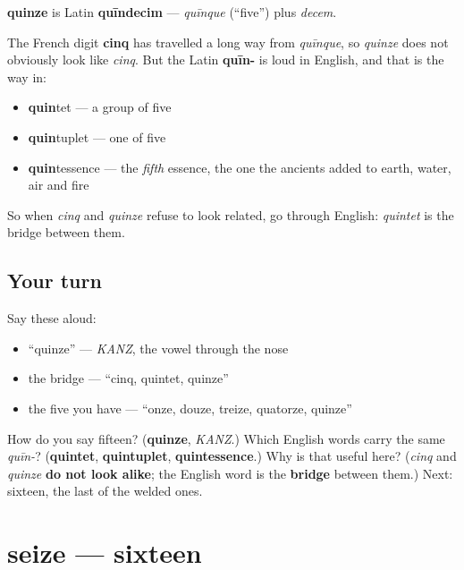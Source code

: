 \begin{cousinweb}
\textbf{quinze} is Latin \textbf{quīndecim} — \emph{quīnque} (\textquotedblleft{}five\textquotedblright{}) plus \emph{decem}.

The French digit \textbf{cinq} has travelled a long way from \emph{quīnque}, so \emph{quinze} does not obviously look like \emph{cinq}. But the Latin \textbf{quīn-} is loud in English, and that is the way in:

\begin{itemize}
\raggedright
  \item \textbf{quin}tet — a group of five
  \item \textbf{quin}tuplet — one of five
  \item \textbf{quin}tessence — the \emph{fifth} essence, the one the ancients added to earth, water, air and fire
\end{itemize}

So when \emph{cinq} and \emph{quinze} refuse to look related, go through English: \emph{quintet} is the bridge between them.
\end{cousinweb}

\subsection*{Your turn}
Say these aloud:

\begin{itemize}
\raggedright
  \item \textquotedblleft{}quinze\textquotedblright{} — \emph{KANZ}, the vowel through the nose
  \item the bridge — \textquotedblleft{}cinq, quintet, quinze\textquotedblright{}
  \item the five you have — \textquotedblleft{}onze, douze, treize, quatorze, quinze\textquotedblright{}
\end{itemize}

\begin{tcolorbox}[breakable,colback=teal!4,colframe=teal!35!black,title={Before you move on}]
How do you say fifteen? (\textbf{quinze}, \emph{KANZ}.) Which English words carry the same \emph{quīn-}? (\textbf{quintet}, \textbf{quintuplet}, \textbf{quintessence}.) Why is that useful here? (\emph{cinq} and \emph{quinze} \textbf{do not look alike}; the English word is the \textbf{bridge} between them.) Next: sixteen, the last of the welded ones.
\end{tcolorbox}
\section[seize]{seize — sixteen}

